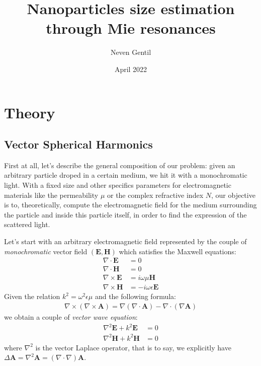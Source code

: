 \documentclass{article}
\title{Nanoparticles size estimation through Mie resonances}
\author{Neven Gentil}
\date{April 2022}
\numberwithin{equation}{section}
\begin{document}
\maketitle

\twocolumn

\section{Theory}

\subsection{Vector Spherical Harmonics}

First at all, let's describe the general composition of our problem: given an arbitrary particle droped in a certain medium, we hit it with a monochromatic light. With a fixed size and other specifics parameters for electromagnetic materials like the permeability $\mu$ or the complex refractive index $N$, our objective is to, theoretically, compute the electromagnetic field for the medium surrounding the particle and inside this particle itself, in order to find the expression of the scattered light.

Let's start with an arbitrary electromagnetic field represented by the couple of \textit{monochromatic} vector field $(\textbf{E}, \textbf{H})$ which satisfies the Maxwell equations:
\begin{align}
\nabla \cdot \textbf{E} &= 0\\
\nabla \cdot \textbf{H} &= 0\\
\nabla \times \textbf{E} &= i\omega \mu \textbf{H} \label{eq:rot_e} \\
\nabla \times \textbf{H} &= -i\omega \epsilon \textbf{E} \label{eq:rot_h}
\end{align}
Given the relation $k^{2} = \omega ^{2}\epsilon \mu$ and the following formula:
\begin{align}\label{eq:rot_rot_a}
\nabla \times (\nabla \times \textbf{A}) = \nabla (\nabla \cdot \textbf{A}) - \nabla \cdot (\nabla \textbf{A})
\end{align}
we obtain a couple of \textit{vector wave equation}:
\begin{align}
\nabla ^{2} \textbf{E} + k^{2}\textbf{E}&=0\\
\nabla ^{2} \textbf{H} + k^{2}\textbf{H}&=0
\end{align}
where $\nabla ^{2}$ is the vector Laplace operator, that is to say, we explicitly have $\Delta \textbf{A} = \nabla ^{2} \textbf{A} = (\nabla \cdot \nabla) \textbf{A}$.
\end{document}
